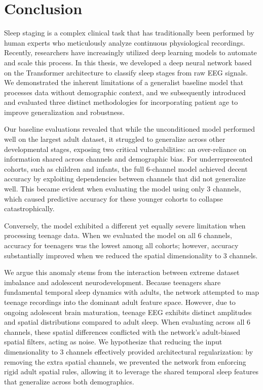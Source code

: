 \chapter{Conclusion}
Sleep staging is a complex clinical task that has traditionally been performed by 
human experts who meticulously analyze continuous physiological recordings.
Recently, researchers have increasingly utilized deep learning models to automate and scale
this process. In this thesis, we developed a deep neural network based on the Transformer
architecture to classify sleep stages from raw EEG signals. We demonstrated the inherent limitations
of a generalist baseline model that processes data without demographic context, and we
subsequently introduced and evaluated three distinct methodologies for incorporating patient age
to improve generalization and robustness.

Our baseline evaluations revealed that while the unconditioned model performed well on the largest adult dataset,
it struggled to generalize across other developmental stages, exposing two critical vulnerabilities: an over-reliance
on information shared across channels and demographic bias. For underrepresented cohorts, such as children and infants,
the full 6-channel model achieved decent accuracy by exploiting dependencies between channels that did not generalize well.
This became evident when evaluating the model using only 3 channels, which caused predictive accuracy for
these younger cohorts to collapse catastrophically.

Conversely, the model exhibited a different yet equally severe limitation when processing teenage data. When we evaluated the model on all 6 channels, accuracy for teenagers was the lowest among all cohorts; however, accuracy substantially improved when we reduced the spatial dimensionality to 3 channels. 

We argue this anomaly stems from the interaction between extreme dataset imbalance and adolescent neurodevelopment. Because teenagers share fundamental temporal sleep dynamics with adults, the network attempted to map teenage recordings into the dominant adult feature space. However, due to ongoing adolescent brain maturation, teenage EEG exhibits distinct amplitudes and spatial distributions compared to adult sleep. When evaluating across all 6 channels, these spatial differences conflicted with the network's adult-biased spatial filters, acting as noise. 
We hypothesize that reducing the input dimensionality to 3 channels effectively provided architectural regularization: by removing the extra spatial channels, we prevented the network from enforcing rigid adult spatial rules, allowing it to leverage the shared temporal sleep features that generalize across both demographics.

